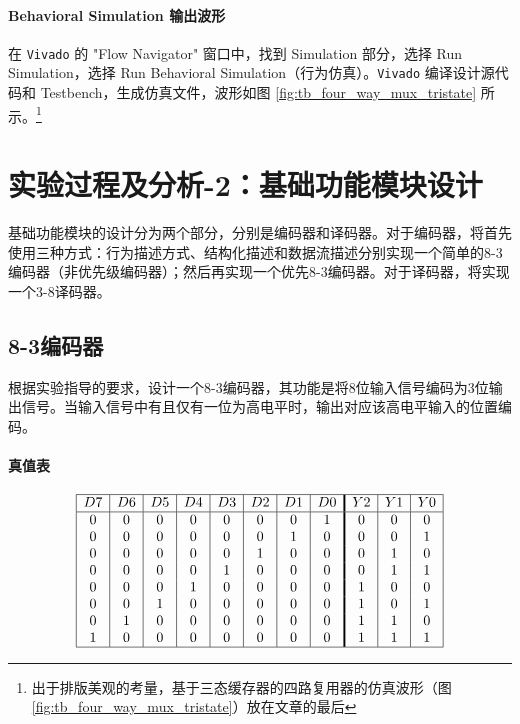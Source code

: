 \documentclass[10pt,a4paper,twoside]{rho-class/rho}
\begin{document}
        \paragraph{Behavioral Simulation 输出波形}
        
            在 \verb|Vivado| 的 "Flow Navigator" 窗口中，找到 Simulation 部分，选择 Run Simulation，选择 Run Behavioral Simulation（行为仿真）。\verb|Vivado| 编译设计源代码和 Testbench，生成仿真文件，波形如图 \ref{fig:tb_four_way_mux_tristate} 所示。\footnote{出于排版美观的考量，基于三态缓存器的四路复用器的仿真波形（图 \ref{fig:tb_four_way_mux_tristate}）放在文章的最后}
        




\section{实验过程及分析-2：基础功能模块设计}
    基础功能模块的设计分为两个部分，分别是编码器和译码器。对于编码器，将首先使用三种方式：行为描述方式、结构化描述和数据流描述分别实现一个简单的8-3编码器（非优先级编码器）；然后再实现一个优先8-3编码器。对于译码器，将实现一个3-8译码器。
    
    \subsection{8-3编码器}
        
            根据实验指导的要求，设计一个8-3编码器，其功能是将8位输入信号编码为3位输出信号。当输入信号中有且仅有一位为高电平时，输出对应该高电平输入的位置编码。

        \paragraph{真值表}
        
            \[
            \begin{array}{|c|c|c|c|c|c|c|c!{\vrule width 1.4pt}c|c|c|}
            \hline
            D7 & D6 & D5 & D4 & D3 & D2 & D1 & D0 & Y2 & Y1 & Y0 \\
            \hline
            0 & 0 & 0 & 0 & 0 & 0 & 0 & 1 & 0 & 0 & 0 \\
            0 & 0 & 0 & 0 & 0 & 0 & 1 & 0 & 0 & 0 & 1 \\
            0 & 0 & 0 & 0 & 0 & 1 & 0 & 0 & 0 & 1 & 0 \\
            0 & 0 & 0 & 0 & 1 & 0 & 0 & 0 & 0 & 1 & 1 \\
            0 & 0 & 0 & 1 & 0 & 0 & 0 & 0 & 1 & 0 & 0 \\
            0 & 0 & 1 & 0 & 0 & 0 & 0 & 0 & 1 & 0 & 1 \\
            0 & 1 & 0 & 0 & 0 & 0 & 0 & 0 & 1 & 1 & 0 \\
            1 & 0 & 0 & 0 & 0 & 0 & 0 & 0 & 1 & 1 & 1 \\
            \hline
            \end{array}
            \]
        
\end{document}
